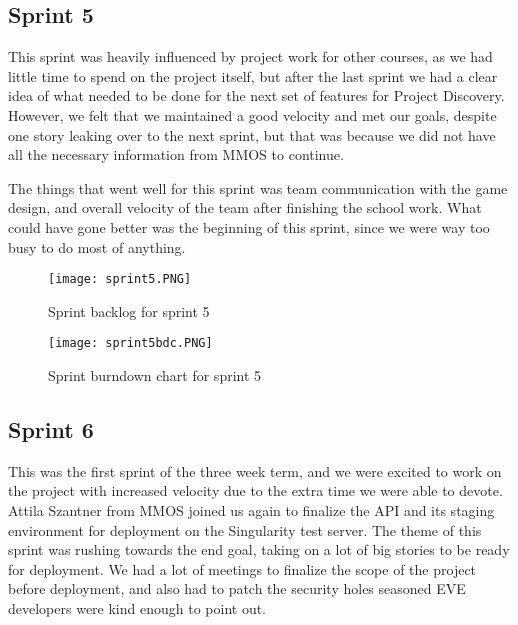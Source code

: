 \subsection{Sprint 5}
This sprint was heavily influenced by project work for other courses, as we had little time to spend on the project itself, but after the last sprint we had a clear idea of what needed to be done for the next set of features for Project Discovery. However, we felt that we maintained a good velocity and met our goals, despite one story leaking over to the next sprint, but that was because we did not have all the necessary information from MMOS to continue.

The things that went well for this sprint was team communication with the game design, and overall velocity of the team after finishing the school work. What could have gone better was the beginning of this sprint, since we were way too busy to do most of anything.

\begin{landscape}

\begin{figure}[H]
	\centering
	\graphicspath{ {./graphics/} }
    \centerline{\texttt{[image: sprint5.PNG]}}
    \caption{\label{fig:s5}Sprint backlog for sprint 5}
\end{figure}

\end{landscape}

\begin{figure}[H]
	\centering
	\graphicspath{ {./graphics/} }
    \centerline{\texttt{[image: sprint5bdc.PNG]}}
    \caption{\label{fig:s5bd}Sprint burndown chart for sprint 5}
\end{figure}

\subsection{Sprint 6}
This was the first sprint of the three week term, and we were excited to work on the project with increased velocity due to the extra time we were able to devote. Attila Szantner from MMOS joined us again to finalize the API and its staging environment for deployment on the Singularity test server. The theme of this sprint was rushing towards the end goal, taking on a lot of big stories to be ready for deployment. We had a lot of meetings to finalize the scope of the project before deployment, and also had to patch the security holes seasoned EVE developers were kind enough to point out. 

